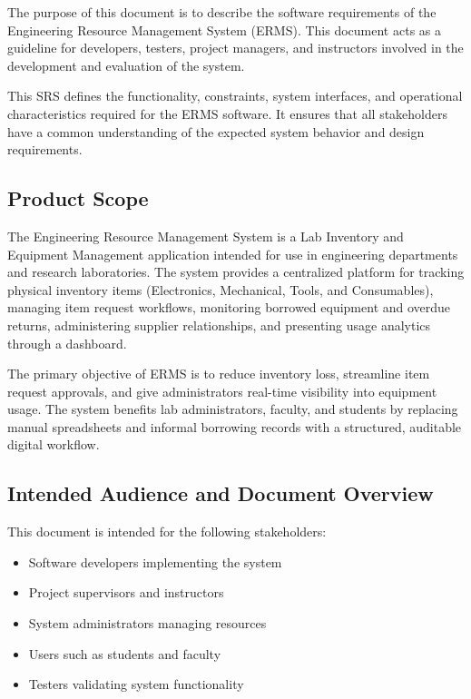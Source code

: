 \documentclass[12pt]{article}
\begin{document}
The purpose of this document is to describe the software requirements of the Engineering Resource Management System (ERMS). This document acts as a guideline for developers, testers, project managers, and instructors involved in the development and evaluation of the system.

This SRS defines the functionality, constraints, system interfaces, and operational characteristics required for the ERMS software. It ensures that all stakeholders have a common understanding of the expected system behavior and design requirements.

\subsection{Product Scope}

The Engineering Resource Management System is a Lab Inventory and Equipment Management application intended for use in engineering departments and research laboratories. The system provides a centralized platform for tracking physical inventory items (Electronics, Mechanical, Tools, and Consumables), managing item request workflows, monitoring borrowed equipment and overdue returns, administering supplier relationships, and presenting usage analytics through a dashboard.

The primary objective of ERMS is to reduce inventory loss, streamline item request approvals, and give administrators real-time visibility into equipment usage. The system benefits lab administrators, faculty, and students by replacing manual spreadsheets and informal borrowing records with a structured, auditable digital workflow.

\subsection{Intended Audience and Document Overview}

This document is intended for the following stakeholders:

\begin{itemize}
\item Software developers implementing the system
\item Project supervisors and instructors
\item System administrators managing resources
\item Users such as students and faculty
\item Testers validating system functionality
\end{itemize}
\end{document}
